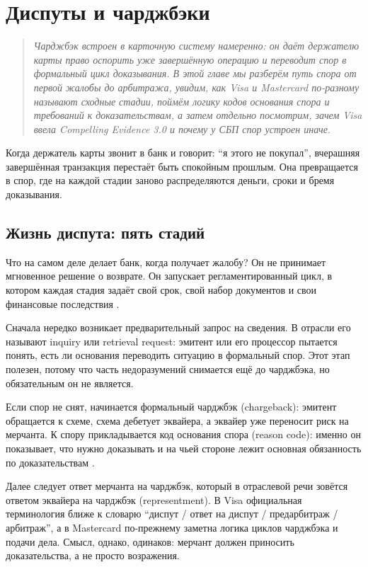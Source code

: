 
\chapter{Диспуты и чарджбэки}
\label{ch:disputes}
\begin{quote}
  \itshape
  Чарджбэк встроен в карточную систему намеренно: он даёт держателю карты
  право оспорить уже завершённую операцию и переводит спор в формальный
  цикл доказывания. В этой главе мы разберём путь спора от первой жалобы
  до арбитража, увидим, как Visa и Mastercard
  по-разному называют сходные стадии, поймём логику кодов основания
  спора и требований к доказательствам, а затем отдельно посмотрим,
  зачем Visa ввела Compelling Evidence 3.0 и почему у СБП спор
  устроен иначе.
\end{quote}

Когда держатель карты звонит в банк и говорит: \enquote{я этого не покупал},
вчерашняя завершённая транзакция перестаёт быть спокойным прошлым. Она
превращается в спор, где на каждой стадии заново распределяются деньги,
сроки и бремя доказывания.

\section{Жизнь диспута: пять стадий}
\label{sec:disputes-lifecycle}

Что на самом деле делает банк, когда получает жалобу? Он не принимает
мгновенное решение о возврате. Он запускает регламентированный цикл, в
котором каждая стадия задаёт свой срок, свой набор документов и свои
финансовые последствия
\cite{visa-dispute-rules}\cite{mc-chargeback-guide}.

Сначала нередко возникает предварительный запрос на сведения. В отрасли
его называют inquiry или retrieval request: эмитент или его процессор
пытается понять, есть ли основания переводить ситуацию в формальный
спор. Этот этап полезен, потому что часть недоразумений снимается ещё
до чарджбэка, но обязательным он не является.

Если спор не снят, начинается формальный чарджбэк (chargeback):
эмитент обращается к схеме, схема дебетует эквайера, а эквайер уже
переносит риск на мерчанта. К спору прикладывается код основания
спора (reason code): именно он показывает, что нужно доказывать и на
чьей стороне лежит основная обязанность по доказательствам
\cite{visa-dispute-rules}.

Далее следует ответ мерчанта на чарджбэк, который в отраслевой речи
зовётся ответом эквайера на чарджбэк (representment). В Visa
официальная терминология ближе к словарю \enquote{диспут / ответ на
диспут / предарбитраж / арбитраж}, а в Mastercard
по-прежнему заметна логика циклов чарджбэка и подачи дела. Смысл,
однако, одинаков: мерчант должен приносить доказательства, а не
просто возражения.

